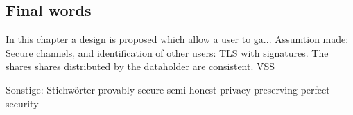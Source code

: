 \documentclass[12pt,a4paper]{scrartcl}				%
\begin{document}
\subsection{Final words}





In this chapter a design is proposed which allow a user to ga...
Assumtion made: Secure channels, and identification of other users: TLS with signatures.
The shares shares distributed by the dataholder are consistent. VSS



Sonstige: Stichwörter
provably secure
semi-honest
privacy-preserving
perfect security


\newpage

\small
\end{document}
